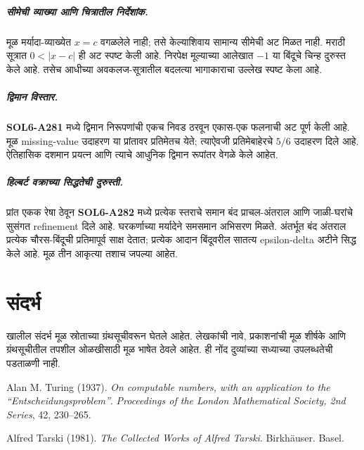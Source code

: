 \paragraph{सीमेची व्याख्या आणि चित्रातील निर्देशांक.} मूळ मर्यादा-व्याख्येत $x=c$ वगळलेले नाही; तसे केल्याशिवाय सामान्य सीमेची अट मिळत नाही. मराठी सूत्रात $0<|x-c|$ ही अट स्पष्ट केली आहे. निरपेक्ष मूल्याच्या आलेखात $-1$ या बिंदूचे चिन्ह दुरुस्त केले आहे. तसेच आधीच्या अवकलज-सूत्रातील बदलत्या भागाकाराचा उल्लेख स्पष्ट केला आहे. \paragraph{द्विमान विस्तार.} \textbf{SOL6-A281} मध्ये द्विमान निरूपणांची एकच निवड ठरवून एकास-एक फलनाची अट पूर्ण केली आहे. मूळ missing-value उदाहरण या प्रांतावर प्रतिमेतच येते; त्याऐवजी प्रतिमेबाहेरचे $5/6$ उदाहरण दिले आहे. ऐतिहासिक दशमान प्रयत्न आणि त्याचे आधुनिक द्विमान रूपांतर वेगळे केले आहेत. \paragraph{हिल्बर्ट वक्राच्या सिद्धतेची दुरुस्ती.} प्रांत एकक रेषा ठेवून \textbf{SOL6-A282} मध्ये प्रत्येक स्तराचे समान बंद प्राचल-अंतराल आणि जाळी-घरांचे सुसंगत refinement दिले आहे. घरकर्णाच्या मर्यादेने समसमान अभिसरण मिळते. अंतर्भूत बंद अंतराल प्रत्येक चौरस-बिंदूची प्रतिमापूर्व साक्ष देतात; प्रत्येक आदान बिंदूवरील सातत्य epsilon-delta अटीने सिद्ध केले आहे. मूळ तीन आकृत्या तशाच जपल्या आहेत.

\chapter*{संदर्भ}


खालील संदर्भ मूळ स्रोताच्या ग्रंथसूचीवरून घेतले आहेत. लेखकांची नावे, प्रकाशनांची मूळ शीर्षके आणि ग्रंथसूचीतील तपशील ओळखीसाठी मूळ भाषेत ठेवले आहेत. ही नोंद दुव्यांच्या सध्याच्या उपलब्धतेची पडताळणी नाही.


\par\medskip{}\label{bib:Turing1937}
Alan M. Turing (1937). \emph{On computable numbers, with an application to the ``{E}ntscheidungsproblem''}. \emph{Proceedings of the London Mathematical Society, 2nd Series}, 42, 230--265.

\par\medskip{}\label{bib:Tarski1981}
Alfred Tarski (1981). \emph{The Collected Works of {A}lfred {T}arski}. Birkh\"{a}user. Basel.

